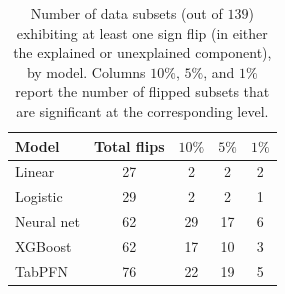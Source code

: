 \begin{table}
    \label{tab:flip_summary_main}
            \caption{Number of data subsets (out of $139$) exhibiting at least one sign flip (in either the explained or unexplained component), by model. Columns $10\%$, $5\%$, and $1\%$ report the number of flipped subsets that are significant at the corresponding level.}
    \centering
    \small
    \begin{tabular}{lcccc}
    \toprule
    Model & Total flips & $10\%$ & $5\%$ & $1\%$ \\
    \midrule
    Linear      & 27 &  2 &  2 &  2 \\
    Logistic    & 29 &  2 &  2 &  1 \\
    Neural net  & 62 & 29 & 17 &  6 \\
    XGBoost     & 62 & 17 & 10 & 3 \\
    TabPFN     & 76 & 22 & 19 & 5 \\
    \bottomrule
    \end{tabular}

\end{table}

